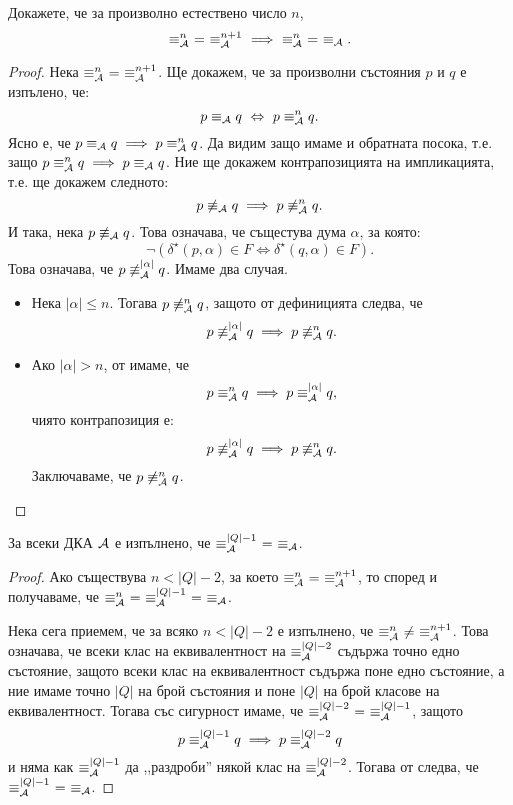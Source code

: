 \begin{proposition}\label{pr:minimisation-cubic:equiv-approx}
  Докажете, че за произволно естествено число $n$,
  \[\equiv^n_\A\ =\ \equiv^{n+1}_\A\ \implies\ \equiv^n_\A\ =\ \equiv_\A.\]
\end{proposition}
\begin{proof}
  Нека $\equiv^n_\A\ =\ \equiv^{n+1}_\A$.
  Ще докажем, че за произволни състояния $p$ и $q$ е изпълено, че:
  \[p \equiv_{\mathcal{A}} q \ \Leftrightarrow\  p \equiv^n_{\mathcal{A}} q.\]
  Ясно е, че $p \equiv_{\mathcal{A}} q \implies p \equiv^n_{\mathcal{A}} q$. 
  Да видим защо имаме и обратната посока, т.е. защо $p \equiv^n_{\mathcal{A}} q \implies p \equiv_{\mathcal{A}} q$.
  Ние ще докажем контрапозицията на импликацията, т.е. ще докажем следното:
  \[p \not\equiv_{\mathcal{A}} q \implies p \not\equiv^n_{\mathcal{A}} q.\]
  И така, нека $p \not\equiv_{\mathcal{A}} q$. Това означава, че същестува дума $\alpha$, за която:
  \[\neg(\delta^\star(p,\alpha) \in F \iff \delta^\star(q,\alpha) \in F).\]
  Това означава, че $p \not\equiv^{|\alpha|}_{\mathcal{A}} q$. Имаме два случая.
  \begin{itemize}
  \item
    Нека $|\alpha| \leq n$.
    Тогава $p \not\equiv^n_{\mathcal{A}} q$, защото от дефиницията следва, че
    \[p \not\equiv^{|\alpha|}_{\mathcal{A}} q \implies p \not\equiv^n_{\mathcal{A}} q.\]
  \item
    Ако $|\alpha| > n$, от  имаме, че
    \[p \equiv^n_{\mathcal{A}} q \implies p \equiv^{|\alpha|}_{\mathcal{A}} q,\]
    чиято контрапозиция е:
    \[p \not\equiv^{|\alpha|}_{\mathcal{A}} q \implies p \not\equiv^{n}_{\mathcal{A}} q.\]
    Заключаваме, че $p \not\equiv^{n}_{\mathcal{A}} q$.
  \end{itemize}
\end{proof}

\begin{proposition}
  За всеки ДКА $\mathcal{A}$ е изпълнено, че 
  $\equiv^{|Q|-1}_\A\ =\ \equiv_\A$.
\end{proposition}
\begin{proof}
  Ако съществува $n < |Q| - 2$, за което $\equiv^n_\A\ =\ \equiv^{n+1}_\A$, то според  и 
  получаваме, че $\equiv^n_\A\ =\ \equiv^{|Q|-1}_\A\ =\ \equiv_\A$.

  Нека сега приемем, че за всяко $n < |Q|-2$ е изпълнено, че $\equiv^n_\A\ \neq\ \equiv^{n+1}_\A$.
  Това означава, че всеки клас на еквивалентност на $\equiv^{|Q|-2}_{\mathcal{A}}$ съдържа точно едно състояние, защото
  всеки клас на еквивалентност съдържа поне едно състояние, а ние имаме точно $|Q|$ на брой състояния и поне $|Q|$ на брой класове на еквивалентност.
  Тогава със сигурност имаме, че $\equiv^{|Q|-2}_{\mathcal{A}}\ =\ \equiv^{|Q|-1}_{\mathcal{A}}$,
  защото
  \[p \equiv^{|Q|-1}_{\mathcal{A}} q \implies p \equiv^{|Q|-2}_{\mathcal{A}} q\]
  и няма как $\equiv^{|Q|-1}_{\mathcal{A}}$ да ,,раздроби'' някой клас на $\equiv^{|Q|-2}_{\mathcal{A}}$.
  Тогава от  следва, че $\equiv^{|Q|-1}_\A\ =\ \equiv_\A$.
\end{proof}

